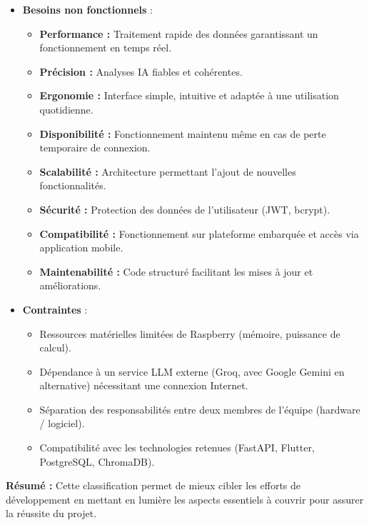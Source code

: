 \begin{itemize}
    \item \textbf{Besoins non fonctionnels} :
    \begin{itemize}
        \item \textbf{Performance :} Traitement rapide des données garantissant un fonctionnement en temps réel.
        \item \textbf{Précision :} Analyses IA fiables et cohérentes.
        \item \textbf{Ergonomie :} Interface simple, intuitive et adaptée à une utilisation quotidienne.
        \item \textbf{Disponibilité :} Fonctionnement maintenu même en cas de perte temporaire de connexion.
        \item \textbf{Scalabilité :} Architecture permettant l'ajout de nouvelles fonctionnalités.
        \item \textbf{Sécurité :} Protection des données de l'utilisateur (\ac{JWT}, bcrypt).
        \item \textbf{Compatibilité :} Fonctionnement sur plateforme embarquée et accès via application mobile.
        \item \textbf{Maintenabilité :} Code structuré facilitant les mises à jour et améliorations.
    \end{itemize}

    \item \textbf{Contraintes} :
    \begin{itemize}
        \item Ressources matérielles limitées de Raspberry (mémoire, puissance de calcul).
        \item Dépendance à un service \ac{LLM} externe (Groq, avec Google Gemini en alternative) nécessitant une connexion Internet.
        \item Séparation des responsabilités entre deux membres de l'équipe (hardware / logiciel).
        \item Compatibilité avec les technologies retenues (FastAPI, Flutter, PostgreSQL, ChromaDB).
    \end{itemize}
\end{itemize}
\vspace{1em}

\noindent\colorbox{gray!15}{%
    \parbox{\dimexpr\linewidth-2\fboxsep}{%
        \small
        \textbf{Résumé :} Cette classification permet de mieux cibler les efforts de développement en mettant en lumière les aspects essentiels à couvrir pour assurer la réussite du projet.
    }%
}

